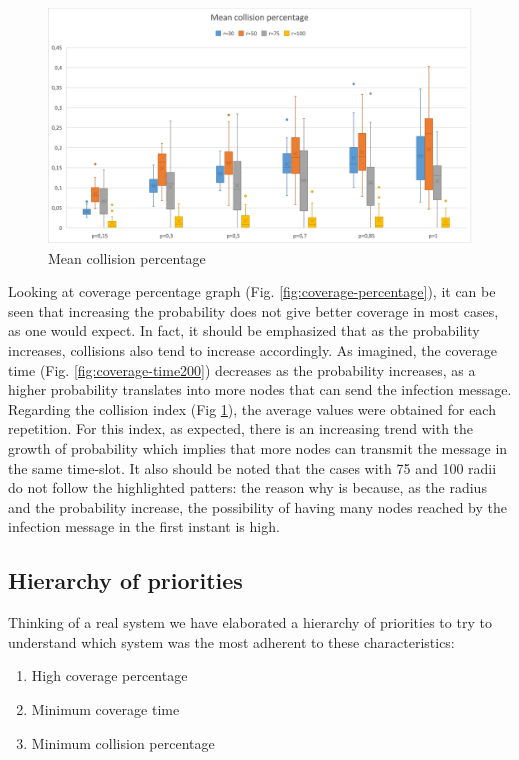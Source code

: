 \clearpage 

\begin{figure}[h!]
\centering
    \includegraphics[width= 1\textwidth]{./images/Collision200Boxplot.png}
    \caption{Mean collision percentage}
    \label{fig:mean-collision-rate200}
\end{figure}

\noindent Looking at coverage percentage graph (Fig. \ref{fig:coverage-percentage}), it can be seen that increasing the probability does not give better coverage in most cases, as one would expect. In fact, it should be emphasized that as the probability increases, collisions also tend to increase accordingly. As imagined, the coverage time (Fig. \ref{fig:coverage-time200}) decreases as the probability increases, as a higher probability translates into more nodes that can send the infection message. Regarding the collision index (Fig \ref{fig:mean-collision-rate200}), the average values were obtained for each repetition. For this index, as expected, there is an increasing trend with the growth of probability which implies that more nodes can transmit the message in the same time-slot. It also should be noted that the cases with 75 and 100 radii do not follow the highlighted patters: the reason why is because, as the radius and the probability increase, the possibility of having many nodes reached by the infection message in the first instant is high.
\clearpage 

\subsection{Hierarchy of priorities}
Thinking of a real system we have elaborated a hierarchy of priorities to try to understand which system was the most adherent to these characteristics:

\begin{enumerate}
\item High coverage percentage
\item Minimum coverage time
\item Minimum collision percentage
\end{enumerate}

